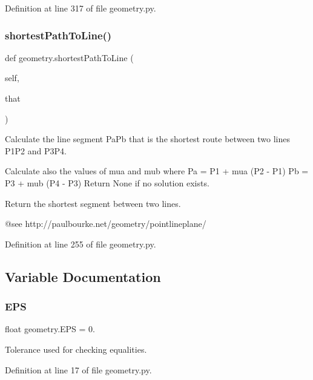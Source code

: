 Definition at line 317 of file geometry.\+py.

\mbox{\label{namespacegeometry_acaccff5b694d39c9db5072c671c6568b}} 
\subsubsection{\texorpdfstring{shortest\+Path\+To\+Line()}{shortestPathToLine()}}
{\footnotesize\ttfamily def geometry.\+shortest\+Path\+To\+Line (\begin{DoxyParamCaption}\item[{}]{self,  }\item[{}]{that }\end{DoxyParamCaption})}



Calculate the line segment Pa\+Pb that is the shortest route between two lines P1\+P2 and P3\+P4. 

Calculate also the values of mua and mub where Pa = P1 + mua (P2 -\/ P1) Pb = P3 + mub (P4 -\/ P3) Return None if no solution exists.\begin{DoxyVerb}Return the shortest segment between two lines.

   @see http://paulbourke.net/geometry/pointlineplane/
\end{DoxyVerb}
 

Definition at line 255 of file geometry.\+py.



\subsection{Variable Documentation}
\mbox{\label{namespacegeometry_a543db87a5e9af9e1d17146559a540276}} 
\subsubsection{\texorpdfstring{E\+PS}{EPS}}
{\footnotesize\ttfamily float geometry.\+E\+PS = 0.}



Tolerance used for checking equalities. 



Definition at line 17 of file geometry.\+py.

